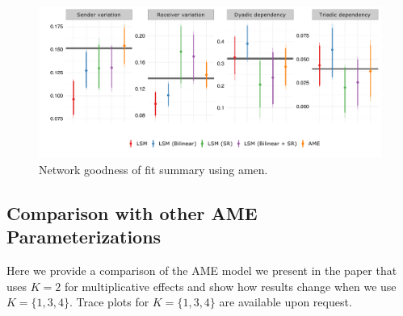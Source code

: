 \documentclass[12pt,pdflatex]{elsarticle}
\newcommand{\pkg}[1]{{\fontseries{b}\selectfont #1}}
\begin{document}
\begin{figure}[ht]
	\centering
	\includegraphics[width=1\textwidth]{netPerfCoef_latSpace}
	\caption{Network goodness of fit summary using \pkg{amen}.}
	\label{fig:netPerfCoef_latSpace}
\end{figure}

\FloatBarrier

\clearpage
\subsection{Comparison with other AME Parameterizations}
\label{sec:ameVsAmeAppendix}

Here we provide a comparison of the AME model we present in the paper that uses $K=2$ for multiplicative effects and show how results change when we use $K=\{1,3,4\}$. Trace plots for $K=\{1,3,4\}$ are available upon request.
\end{document}
